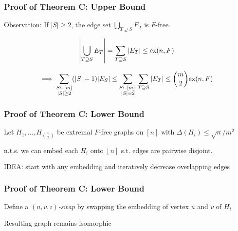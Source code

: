 \documentclass{beamer}
\newcommand*{\ex}{\textnormal{ex}}
\begin{document}
\begin{frame}
  \frametitle{Proof of Theorem C: Upper Bound}

  Observation: If $|S| \geq 2$, the edge set $\bigcup_{T \supseteq S} E_T$ is $F$-free.

  \pause

  \vspace{0.3cm}

  \[
    \left|\bigcup_{T \supseteq S} E_T\right| = \sum_{T \supseteq S} |E_T| \leq \ex(n, F)
  \]
  \pause

  \vspace{0.3cm}

  \[
    \implies \sum_{\substack{S \subseteq [m] \\ |S| \geq 2}} (|S| - 1)|E_S| \leq \sum_{\substack{S \subseteq [m], \\ |S| = 2}} \sum_{T \supseteq S} |E_T| \leq \binom{m}{2}\ex(n, F)
  \]
\end{frame}

\begin{frame}
  \frametitle{Proof of Theorem C: Lower Bound}

  Let $H_1, \ldots, H_{\binom{m}{2}}$ be extremal $F$-free graphs on $[n]$ with $\Delta(H_i) \leq \sqrt{n}/m^2$

  \pause

  \vspace{0.7cm}

  n.t.s. we can embed each $H_i$ onto $[n]$ s.t. edges are pairwise disjoint.

  \pause

  \vspace{0.7cm}

  IDEA: start with any embedding and iteratively decrease overlapping edges
\end{frame}

\begin{frame}
  \frametitle{Proof of Theorem C: Lower Bound}

  Define a \textit{$(u, v, i)$-swap} by swapping the embedding of vertex $u$ and $v$ of $H_i$

  \pause

  \vspace{0.7cm} Resulting graph remains isomorphic
\end{frame}
\end{document}
